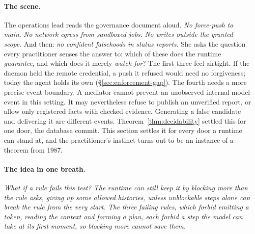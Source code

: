 \documentclass[11pt,a4paper]{article}
\theoremstyle{definition}
\theoremstyle{remark}
\begin{document}
\paragraph{The scene.}
The operations lead reads the governance document aloud. \emph{No force-push to main. No
network egress from sandboxed jobs. No writes outside the granted scope.} And then: \emph{no
confident falsehoods in status reports.} She asks the question every practitioner senses the
answer to: which of these does the runtime \emph{guarantee}, and which does it merely
\emph{watch for}? The first three feel airtight. If the daemon held the remote credential, a
push it refused would need no forgiveness; today the agent holds its own
(\S\ref{sec:enforcement-gap}). The fourth needs a more precise event boundary. A mediator cannot prevent
an unobserved internal model event in this setting. It may nevertheless refuse
to publish an unverified report, or allow only registered facts with checked
evidence. Generating a false candidate and delivering it are different events. Theorem~\ref{thm:decidability} settled this for one
door, the database commit. This section settles it for every door a runtime can stand at,
and the practitioner's instinct turns out to be an instance of a theorem from 1987.

\paragraph{The idea in one breath.}
\emph{What if a rule fails this test? The runtime can still keep it by blocking
more than the rule asks, giving up some allowed histories, unless unblockable
steps alone can break the rule from the very start. The three failing rules,
which forbid emitting a token, reading the context and forming a plan, each
forbid a step the model can take at its first moment, so blocking more cannot
save them.}
\end{document}
